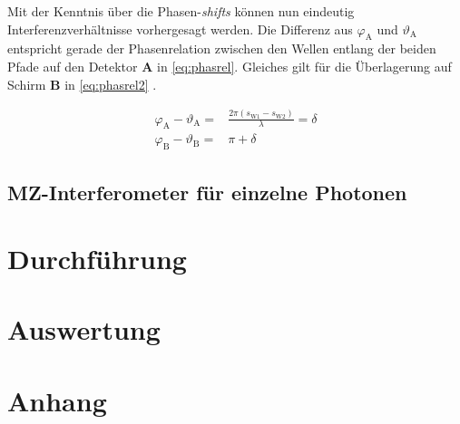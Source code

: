 \documentclass[numbers=noenddot,a4paper,notitlepage,twoside,BCOR15mm]{scrartcl}
\newcommand{\ix}[1]{_\text{#1}}
\newcommand{\tilt}[1]{\textit{#1}}
\newcommand{\fett}[1]{\textbf{#1}}
\begin{document}
			Mit der Kenntnis über die Phasen-\tilt{shifts} können nun eindeutig Interferenzverhältnisse vorhergesagt werden. Die Differenz aus $\varphi\ix{A}$ und $\vartheta\ix{A}$ entspricht gerade der Phasenrelation zwischen den Wellen entlang der beiden Pfade auf den Detektor \fett{A} in \autoref{eq:phasrel}. Gleiches gilt für die Überlagerung auf Schirm \fett{B} in \autoref{eq:phasrel2} \cite{MZwork}.

				\begin{align}
					\varphi\ix{A}-\vartheta\ix{A}=&\frac{2\pi (s\ix{W1}-s\ix{W2})}{\lambda}=\delta \label{eq:phasrel}\\
					\varphi\ix{B}-\vartheta\ix{B}=&\pi+\delta \label{eq:phasrel2}
				\end{align}


			\subsection{MZ-Interferometer für einzelne Photonen}

	\clearpage
	\section{Durchführung}
	
	\clearpage
	\section{Auswertung}
	
	\clearpage
	\section{Anhang}



\end{document}
